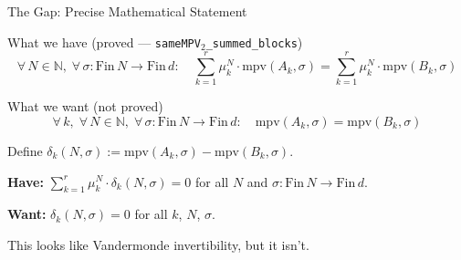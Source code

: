 \documentclass[aspectratio=169,10pt]{beamer}
\begin{document}
\begin{frame}{The Gap: Precise Mathematical Statement}
\vspace{-0.5em}
\begin{block}{What we have (proved --- \texttt{sameMPV${}_2$\_summed\_blocks})}
\vspace{-0.6em}
\[
\forall\, N\in\mathbb{N},\; \forall\,\sigma\!: \mathrm{Fin}\,N \to \mathrm{Fin}\,d:\quad
\sum_{k=1}^{r} \mu_k^N \cdot \mathrm{mpv}(A_k, \sigma) = 
\sum_{k=1}^{r} \mu_k^N \cdot \mathrm{mpv}(B_k, \sigma)
\]
\vspace{-0.8em}
\end{block}
\vspace{-0.2em}
\begin{block}{What we want (not proved)}
\vspace{-0.6em}
\[
\forall\, k,\; \forall\, N\in\mathbb{N},\; \forall\,\sigma\!: \mathrm{Fin}\,N \to \mathrm{Fin}\,d:\quad
\mathrm{mpv}(A_k, \sigma) =  \mathrm{mpv}(B_k, \sigma)
\]
\vspace{-0.8em}
\end{block}

\vspace{0.1em}
{\small Define $\delta_k(N, \sigma) :=  \mathrm{mpv}(A_k, \sigma) - \mathrm{mpv}(B_k, \sigma)$.}

\vspace{0.15em}
{\small \textbf{Have:} $\sum_{k=1}^r \mu_k^N \cdot \delta_k(N, \sigma) = 0$ for all $N$ and $\sigma : \mathrm{Fin}\,N \to \mathrm{Fin}\,d$.}

\vspace{0.05em}
{\small \textbf{Want:} $\delta_k(N, \sigma) = 0$ for all $k$, $N$, $\sigma$.}

\vspace{0.2em}
{\small This looks like Vandermonde invertibility, but it isn't.}
\end{frame}
\end{document}
